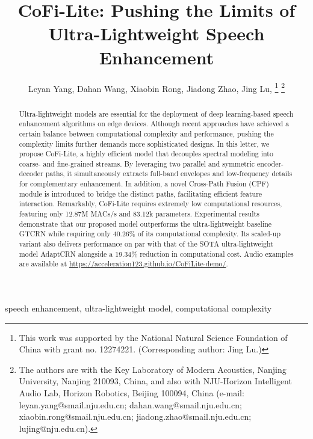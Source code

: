 \documentclass[journal]{IEEEtran}
\begin{document}
\title{CoFi-Lite: Pushing the Limits of Ultra-Lightweight Speech Enhancement}

\author{Leyan Yang, Dahan Wang, Xiaobin Rong, Jiadong Zhao, Jing Lu, 
\thanks{
This work was supported by the National Natural Science Foundation of China with grant no. 12274221. (Corresponding author: Jing Lu.)}
\thanks{The authors are with the Key Laboratory of Modern Acoustics, Nanjing University, Nanjing 210093, China, and also with NJU-Horizon Intelligent Audio Lab, Horizon Robotics, Beijing 100094, China (e-mail: leyan.yang@smail.nju.edu.cn; dahan.wang@smail.nju.edu.cn; xiaobin.rong@smail.nju.edu.cn; jiadong.zhao@smail.nju.edu.cn; lujing@nju.edu.cn).}}

\maketitle

\begin{abstract}
Ultra-lightweight models are essential for the deployment of deep learning-based speech enhancement algorithms on edge devices.
Although recent approaches have achieved a certain balance between computational complexity and performance, pushing the complexity limits further demands more sophisticated designs.
In this letter, we propose CoFi-Lite, a highly efficient model that decouples spectral modeling into coarse- and fine-grained streams.
By leveraging two parallel and symmetric encoder-decoder paths, it simultaneously extracts full-band envelopes and low-frequency details for complementary enhancement.
In addition, a novel Cross-Path Fusion (CPF) module is introduced to bridge the distinct paths, facilitating efficient feature interaction.
Remarkably, CoFi-Lite requires extremely low computational resources, featuring only 12.87M MACs/s and 83.12k parameters.
Experimental results demonstrate that our proposed model outperforms the ultra-lightweight baseline GTCRN while requiring only 40.26\% of its computational complexity. 
Its scaled-up variant also delivers performance on par with that of the SOTA ultra-lightweight model AdaptCRN alongside a 19.34\% reduction in computational cost.
Audio examples are available at \href{https://acceleration123.github.io/CoFiLite-demo/}{https://acceleration123.github.io/CoFiLite-demo/}.
\end{abstract}

\begin{IEEEkeywords}
speech enhancement,
ultra-lightweight model,
computational complexity
\end{IEEEkeywords}
\end{document}
